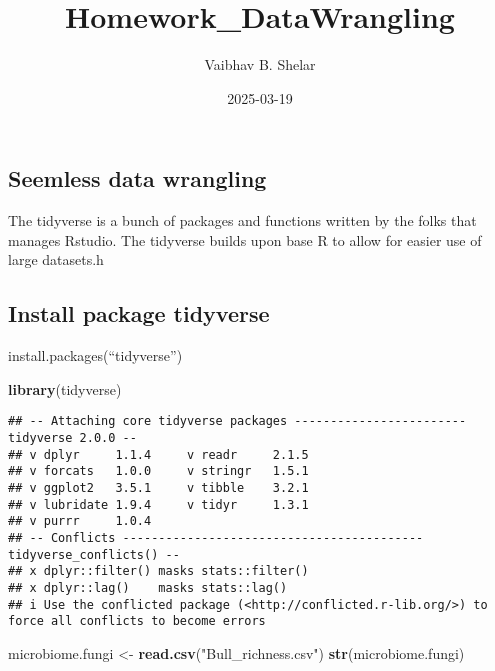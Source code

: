 \documentclass[
]{article}
\title{Homework\_DataWrangling}
\author{Vaibhav B. Shelar}
\date{2025-03-19}
\newenvironment{Shaded}{\begin{snugshade}}{\end{snugshade}}
\newcommand{\FunctionTok}[1]{\textcolor[rgb]{0.13,0.29,0.53}{\textbf{#1}}}
\newcommand{\NormalTok}[1]{#1}
\newcommand{\OtherTok}[1]{\textcolor[rgb]{0.56,0.35,0.01}{#1}}
\newcommand{\StringTok}[1]{\textcolor[rgb]{0.31,0.60,0.02}{#1}}
\begin{document}
\maketitle

\subsection{Seemless data wrangling}\label{seemless-data-wrangling}

The tidyverse is a bunch of packages and functions written by the folks
that manages Rstudio. The tidyverse builds upon base R to allow for
easier use of large datasets.h

\subsection{Install package tidyverse}\label{install-package-tidyverse}

install.packages(``tidyverse'')

\begin{Shaded}
\begin{Highlighting}[]
\FunctionTok{library}\NormalTok{(tidyverse)}
\end{Highlighting}
\end{Shaded}

\begin{verbatim}
## -- Attaching core tidyverse packages ------------------------ tidyverse 2.0.0 --
## v dplyr     1.1.4     v readr     2.1.5
## v forcats   1.0.0     v stringr   1.5.1
## v ggplot2   3.5.1     v tibble    3.2.1
## v lubridate 1.9.4     v tidyr     1.3.1
## v purrr     1.0.4     
## -- Conflicts ------------------------------------------ tidyverse_conflicts() --
## x dplyr::filter() masks stats::filter()
## x dplyr::lag()    masks stats::lag()
## i Use the conflicted package (<http://conflicted.r-lib.org/>) to force all conflicts to become errors
\end{verbatim}

\begin{Shaded}
\begin{Highlighting}[]
\NormalTok{microbiome.fungi }\OtherTok{\textless{}{-}} \FunctionTok{read.csv}\NormalTok{(}\StringTok{"Bull\_richness.csv"}\NormalTok{)}
\FunctionTok{str}\NormalTok{(microbiome.fungi)}
\end{Highlighting}
\end{Shaded}
\end{document}
